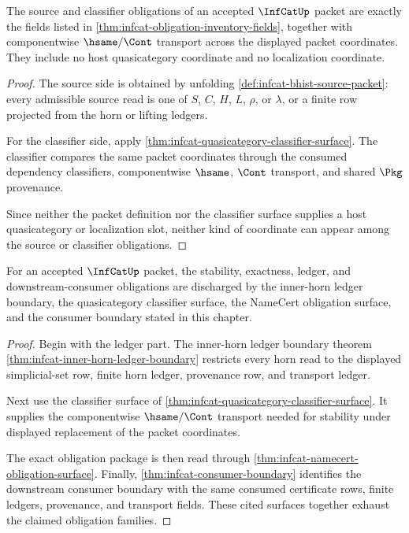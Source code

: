 \begin{theorem}
\label{thm:infcat-source-and-classifier-obligations}
The source and classifier obligations of an accepted $\InfCatUp$ packet are
exactly the fields listed in
\autoref{thm:infcat-obligation-inventory-fields}, together with componentwise
$\hsame/\Cont$ transport across the displayed packet coordinates. They include
no host quasicategory coordinate and no localization coordinate.
\end{theorem}
\begin{proof}
The source side is obtained by unfolding
\autoref{def:infcat-bhist-source-packet}: every admissible source read is one
of $S$, $C$, $H$, $L$, $\rho$, or $\lambda$, or a finite row projected from the
horn or lifting ledgers.

For the classifier side, apply
\autoref{thm:infcat-quasicategory-classifier-surface}. The classifier compares
the same packet coordinates through the consumed dependency classifiers,
componentwise $\hsame$, $\Cont$ transport, and shared $\Pkg$ provenance.

Since neither the packet definition nor the classifier surface supplies a host
quasicategory or localization slot, neither kind of coordinate can appear among
the source or classifier obligations.
\end{proof}

\begin{theorem}
\label{thm:infcat-stability-exactness-ledger-obligations}
For an accepted $\InfCatUp$ packet, the stability, exactness, ledger, and
downstream-consumer obligations are discharged by the inner-horn ledger
boundary, the quasicategory classifier surface, the NameCert obligation
surface, and the consumer boundary stated in this chapter.
\end{theorem}
\begin{proof}
Begin with the ledger part. The inner-horn ledger boundary theorem
\autoref{thm:infcat-inner-horn-ledger-boundary} restricts every horn read to
the displayed simplicial-set row, finite horn ledger, provenance row, and
transport ledger.

Next use the classifier surface of
\autoref{thm:infcat-quasicategory-classifier-surface}. It supplies the
componentwise $\hsame/\Cont$ transport needed for stability under displayed
replacement of the packet coordinates.

The exact obligation package is then read through
\autoref{thm:infcat-namecert-obligation-surface}. Finally,
\autoref{thm:infcat-consumer-boundary} identifies the downstream consumer
boundary with the same consumed certificate rows, finite ledgers, provenance,
and transport fields. These cited surfaces together exhaust the claimed
obligation families.
\end{proof}

